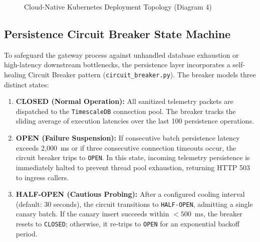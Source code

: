 \begin{figure}[H]
\caption{Cloud-Native Kubernetes Deployment Topology (Diagram 4)}
\label{fig:deployment_architecture}
\end{figure}

\subsection{Persistence Circuit Breaker State Machine}
To safeguard the gateway process against unhandled database exhaustion or high-latency downstream bottlenecks, the persistence layer incorporates a self-healing Circuit Breaker pattern (\texttt{circuit\_breaker.py}). The breaker models three distinct states:
\begin{enumerate}
    \item \textbf{CLOSED (Normal Operation):} All sanitized telemetry packets are dispatched to the \texttt{TimescaleDB} connection pool. The breaker tracks the sliding average of execution latencies over the last 100 persistence operations.
    \item \textbf{OPEN (Failure Suspension):} If consecutive batch persistence latency exceeds 2,000~ms or if three consecutive connection timeouts occur, the circuit breaker trips to \texttt{OPEN}. In this state, incoming telemetry persistence is immediately halted to prevent thread pool exhaustion, returning HTTP 503 to ingress callers.
    \item \textbf{HALF-OPEN (Cautious Probing):} After a configured cooling interval (default: 30 seconds), the circuit transitions to \texttt{HALF-OPEN}, admitting a single canary batch. If the canary insert succeeds within $< 500$~ms, the breaker resets to \texttt{CLOSED}; otherwise, it re-trips to \texttt{OPEN} for an exponential backoff period.
\end{enumerate}
